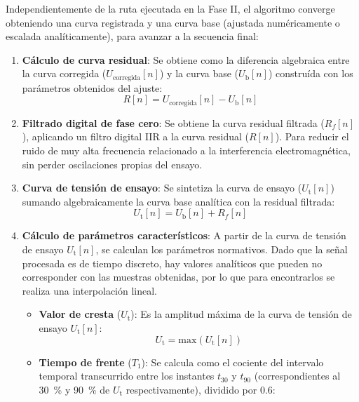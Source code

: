 Independientemente de la ruta ejecutada en la Fase II, el algoritmo converge obteniendo una curva registrada y una curva base (ajustada numéricamente o escalada analíticamente), para avanzar a la secuencia final:
\begin{enumerate}[resume]
    \item \textbf{Cálculo de curva residual}: Se obtiene como la diferencia algebraica entre la curva corregida ($U_{\text{corregida}}[n]$) y la curva base ($U_\text{b}[n]$) construída con los parámetros obtenidos del ajuste:
    \begin{equation}
        \label{eq:curva_residual}
        R[n] = U_{\text{corregida}}[n] - U_\text{b}[n]
    \end{equation}
    \item \textbf{Filtrado digital de fase cero}: 
    Se obtiene la curva residual filtrada ($R_f[n]$), aplicando un filtro digital IIR a la curva residual ($R[n]$). Para reducir el ruido de muy alta frecuencia relacionado a la interferencia electromagnética, sin perder oscilaciones propias del ensayo.
    \item \textbf{Curva de tensión de ensayo}: Se sintetiza la curva de ensayo ($U_\text{t}[n]$) sumando algebraicamente la curva base analítica con la residual filtrada:
    \begin{equation}
        \label{eq:curva_ensayo}
        U_\text{t}[n] = U_\text{b}[n] + R_f[n]
    \end{equation}
    \item \textbf{Cálculo de parámetros característicos}: A partir de la curva de tensión de ensayo $U_\text{t}[n]$, se calculan los parámetros normativos. Dado que la señal procesada es de tiempo discreto, hay valores analíticos que pueden no corresponder con las muestras obtenidas, por lo que para encontrarlos se realiza una interpolación lineal.
    \begin{itemize}
        \item \textbf{Valor de cresta} ($U_\text{t}$): Es la amplitud máxima de la curva de tensión de ensayo $U_\text{t}[n]$:
        \begin{equation}
            \label{eq:valor_cresta}
            U_\text{t} = \text{max}(U_\text{t}[n])
        \end{equation}
        \item \textbf{Tiempo de frente} ($T_1$): Se calcula como el cociente del intervalo temporal transcurrido entre los instantes $t_{30}$ y $t_{90}$ (correspondientes al \qty{30}{\percent} y \qty{90}{\percent} de $U_\text{t}$ respectivamente), dividido por $\num{0.6}$:

\end{itemize}
\end{enumerate}
